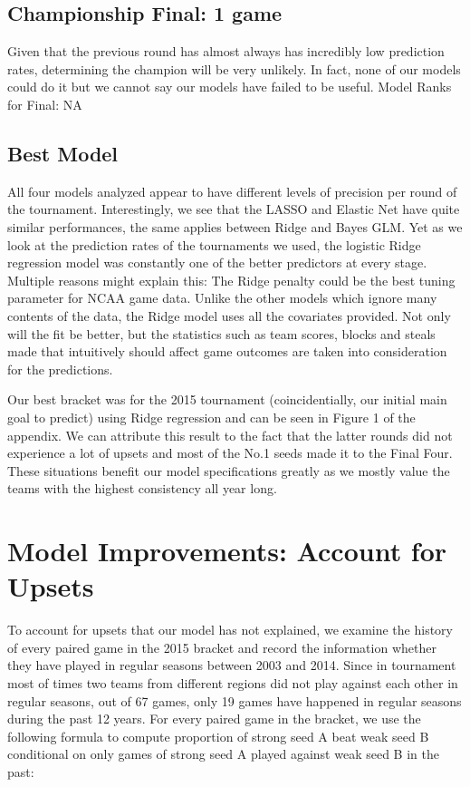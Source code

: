 \documentclass{article} %
\begin{document}
\subsection{Championship Final: 1 game}
Given that the previous round has almost always has incredibly low prediction rates, determining the champion will be very unlikely. In fact, none of our models could do it but we cannot say our models have failed to be useful. Model Ranks for Final: NA

\subsection{Best Model}

All four models analyzed appear to have different levels of precision per round of the tournament. Interestingly, we see that the LASSO and Elastic Net have quite similar performances, the same applies between Ridge and Bayes GLM. Yet as we look at the prediction rates of the tournaments we used, the logistic Ridge regression model was constantly one of the better predictors at every stage. Multiple reasons might explain this: The Ridge penalty could be the best tuning parameter for NCAA game data. Unlike the other models which ignore many contents of the data, the Ridge model uses all the covariates provided. Not only will the fit be better, but the statistics such as team scores, blocks and steals made that intuitively should affect game outcomes are taken into consideration for the predictions.

Our best bracket was for the 2015 tournament (coincidentially, our initial main goal to predict) using Ridge regression and can be seen in Figure 1 of the appendix. We can attribute this result to the fact that the latter rounds did not experience a lot of upsets and most of the No.1 seeds made it to the Final Four. These situations benefit our model specifications greatly as we mostly value the teams with the highest consistency all year long.\

\section{Model Improvements: Account for Upsets}

To account for upsets that our model has not explained, we examine the history of every paired game in the 2015 bracket and record the information whether they have played in regular seasons between 2003 and 2014. Since in tournament most of times two teams from different regions did not play against each other in regular seasons, out of 67 games, only 19 games have happened in regular seasons during the past 12 years. For every paired game in the bracket, we use the following formula to compute proportion of strong seed A beat weak seed B conditional on only games of strong seed A played against weak seed B in the past:
\end{document}
